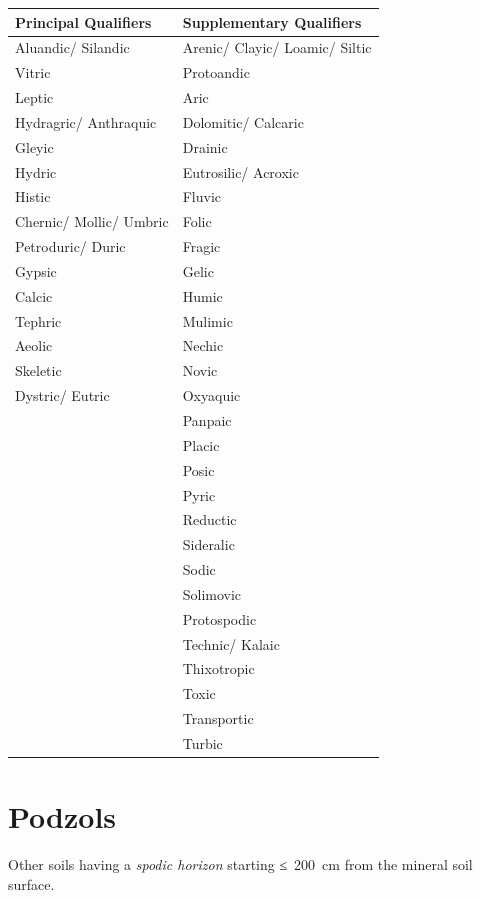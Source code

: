 \documentclass[
  letterpaper,
  DIV=11,
  numbers=noendperiod]{scrreprt}
\begin{document}
\begin{longtable}[]{@{}ll@{}}
\toprule()
Principal Qualifiers & Supplementary Qualifiers \\
\midrule()
\endhead
Aluandic/ Silandic & Arenic/ Clayic/ Loamic/ Siltic \\
Vitric & Protoandic \\
Leptic & Aric \\
Hydragric/ Anthraquic & Dolomitic/ Calcaric \\
Gleyic & Drainic \\
Hydric & Eutrosilic/ Acroxic \\
Histic & Fluvic \\
Chernic/ Mollic/ Umbric & Folic \\
Petroduric/ Duric & Fragic \\
Gypsic & Gelic \\
Calcic & Humic \\
Tephric & Mulimic \\
Aeolic & Nechic \\
Skeletic & Novic \\
Dystric/ Eutric & Oxyaquic \\
& Panpaic \\
& Placic \\
& Posic \\
& Pyric \\
& Reductic \\
& Sideralic \\
& Sodic \\
& Solimovic \\
& Protospodic \\
& Technic/ Kalaic \\
& Thixotropic \\
& Toxic \\
& Transportic \\
& Turbic \\
\bottomrule()
\end{longtable}


\hypertarget{key-podzols}{%
\chapter{Podzols}\label{key-podzols}}

Other soils having a \emph{spodic horizon} starting ≤~200~cm from the
mineral soil surface.
\end{document}
